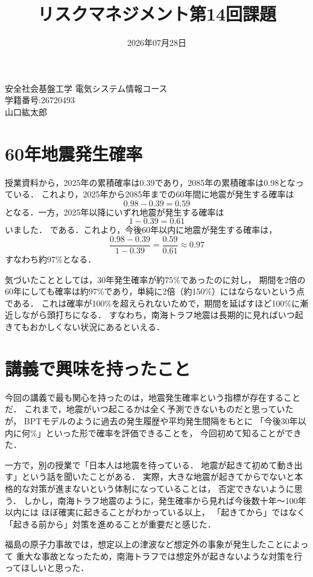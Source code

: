 \documentclass{ltjsarticle}  %
\date{2026年07月28日}        %
\title{リスクマネジメント第14回課題}  %
\makeatletter
\newcommand{\authorname}{安全社会基盤工学 電気システム情報コース\\学籍番号:26720493\\山口紘太郎}  %
\renewcommand{\maketitle}{%
  \begin{flushright}
    \@date
  \end{flushright}
  \vspace{1cm}
  \begin{center}
    {\Large \@title}
  \end{center}
  \begin{flushright}
    {\large \authorname}
  \end{flushright}
  \vspace{1.5cm}
}
\makeatother
\begin{document}
\maketitle

\section{60年地震発生確率}
授業資料から，2025年の累積確率は0.39であり，2085年の累積確率は0.98となっている．
これより，2025年から2085年までの60年間に地震が発生する確率は
\[
	0.98 - 0.39 = 0.59
\]
となる．一方，2025年以降にいずれ地震が発生する確率は
\[
	1 - 0.39 = 0.61
\]いました．
である．これより，今後60年以内に地震が発生する確率は，
\[
	\frac{0.98 - 0.39}{1 - 0.39} = \frac{0.59}{0.61} \approx 0.97
\]
すなわち約97\%となる．

気づいたこととしては，30年発生確率が約75\%であったのに対し，
期間を2倍の60年にしても確率は約97\%であり，単純に2倍（約150\%）にはならないという点である．
これは確率が100\%を超えられないためで，期間を延ばすほど100\%に漸近しながら頭打ちになる．
すなわち，南海トラフ地震は長期的に見ればいつ起きてもおかしくない状況にあるといえる．

\section{講義で興味を持ったこと}
今回の講義で最も関心を持ったのは，地震発生確率という指標が存在することだ．
これまで，地震がいつ起こるかは全く予測できないものだと思っていたが，
BPTモデルのように過去の発生履歴や平均発生間隔をもとに
「今後30年以内に何\%」といった形で確率を評価できることを，
今回初めて知ることができた．

一方で，別の授業で「日本人は地震を待っている．
地震が起きて初めて動き出す」という話を聞いたことがある．
実際，大きな地震が起きてからでないと本格的な対策が進まないという体制になっていることは，
否定できないように思う．
しかし，南海トラフ地震のように，発生確率から見れば今後数十年〜100年以内には
ほぼ確実に起きることがわかっている以上，
「起きてから」ではなく「起きる前から」対策を進めることが重要だと感じた．

福島の原子力事故では，想定以上の津波など想定外の事象が発生したことによって
重大な事故となったため，南海トラフでは想定外が起きないような対策を行ってほしいと思った．
\end{document}
